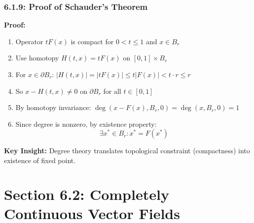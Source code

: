 \documentclass[aspectratio=169,10pt]{beamer}
\begin{document}
\begin{frame}
\frametitle{6.1.9: Proof of Schauder's Theorem}

\textbf{Proof:}
\begin{enumerate}
    \item Operator $tF(x)$ is compact for $0 < t \leq 1$ and $x \in B_r$
    \vspace{0.2cm}
    \item Use homotopy $H(t,x) = tF(x)$ on $[0,1] \times B_r$
    \vspace{0.2cm}
    \item For $x \in \partial B_r$: $|H(t,x)| = |tF(x)| \leq t|F(x)| < t \cdot r \leq r$
    \vspace{0.2cm}
    \item So $x - H(t,x) \neq 0$ on $\partial B_r$ for all $t \in [0,1]$
    \vspace{0.2cm}
    \item By homotopy invariance: $\deg(x - F(x), B_r, 0) = \deg(x, B_r, 0) = 1$
    \vspace{0.2cm}
    \item Since degree is nonzero, by existence property:
    $$\exists x^* \in B_r: x^* = F(x^*)$$
\end{enumerate}

\vspace{0.3cm}
\textbf{Key Insight:} Degree theory translates topological constraint (compactness) into existence of fixed point.
\end{frame}


\section{Section 6.2: Completely Continuous Vector Fields}
\end{document}
